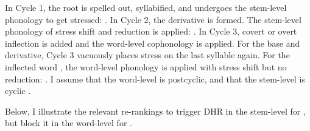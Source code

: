 In Cycle 1, the root is spelled out, syllabified, and undergoes the stem-level phonology to get stressed: \textit{}. In Cycle 2, the derivative is formed. The stem-level phonology of stress shift and reduction is applied: \textit{}. In Cycle 3, covert or overt inflection is added and the word-level cophonology is applied. For the base and derivative, Cycle 3 vacuously places stress on the last syllable again. For the inflected word \textit{}, the word-level phonology is applied with stress shift but no reduction: \textit{}. I assume that the word-level is postcyclic, and that the stem-level is cyclic \citep{BooijRubach-1987-PostcyclicPostLexical}. %



Below, I illustrate the relevant re-rankings to trigger DHR in the stem-level for \textit{}, but block it in the word-level for \textit{}.%





